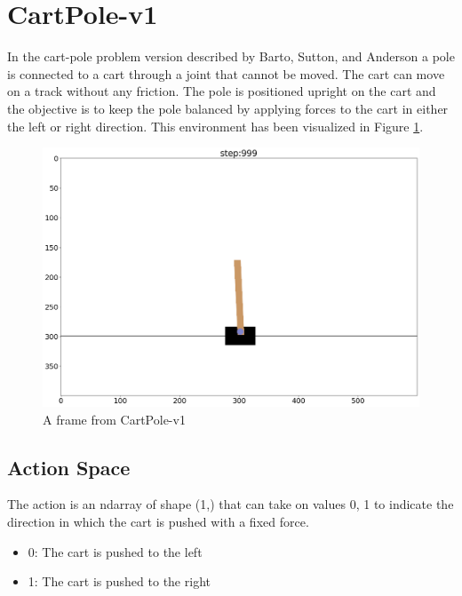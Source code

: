 \documentclass{article} %
\begin{document}
\section{CartPole-v1}
\label{sec:cart-definition}

In the cart-pole problem version described by Barto, Sutton, and Anderson 
\cite{barto1983neuronlike} a pole is
connected to a cart through a joint that cannot be moved. The cart can move on a track
without any friction. The pole is positioned upright on the cart and the objective is to
keep the pole balanced by applying forces to the cart in either the left or right direction.
This environment has been visualized in Figure \ref{fig:cartpole-rendering}.

\begin{figure}[h]
    \begin{center}
        \includegraphics[width=\textwidth]{cartpole.png}
    \end{center}
    \caption{A frame from CartPole-v1}
    \label{fig:cartpole-rendering}
\end{figure}

\subsection{Action Space}
The action is an ndarray of shape (1,) that can take on values {0, 1} to indicate the
direction in which the cart is pushed with a fixed force.

\begin{itemize}
    \item 0: The cart is pushed to the left
    \item 1: The cart is pushed to the right
\end{itemize}
\end{document}
